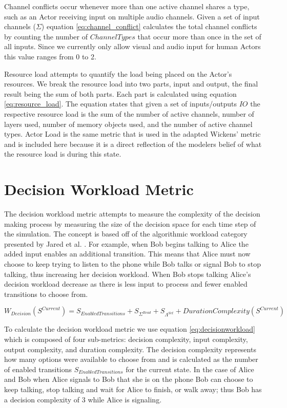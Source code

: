 Channel conflicts occur whenever more than one active channel shares a type, such as an Actor receiving input on multiple audio channels.  Given a set of input channels ($\Sigma$) equation \ref{eq:channel_conflict} calculates the total channel conflicts by counting the number of $ChannelTypes$ that occur more than once in the set of all inputs.  Since we currently only allow visual and audio input for human Actors this value ranges from 0 to 2.  

Resource load attempts to quantify the load being placed on the Actor's resources.  We break the resource load into two parts, input and output, the final result being the sum of both parts.  Each part is calculated using equation \ref{eq:resource_load}.  The equation states that given a set of inputs/outputs $IO$ the respective resource load is the sum of the number of active channels, number of layers used, number of memory objects used, and the number of active channel types.  Actor Load is the same metric that is used in the adapted Wickens' metric and is included here because it is a direct reflection of the modelers belief of what the resource load is during this state.


\section{Decision Workload Metric}

The decision workload metric attempts to measure the complexity of the decision making process by measuring the size of the decision space for each time step of the simulation.  The concept is based off of the algorithmic workload category presented by Jared et al. \cite{moore2014modeling}.  For example, when Bob begins talking to Alice the added input enables an additional transition.  This means that Alice must now choose to keep trying to listen to the phone while Bob talks or signal Bob to stop talking, thus increasing her decision workload.  When Bob stops talking Alice's decision workload decrease as there is less input to process and fewer enabled transitions to choose from.

\begin{equation}
  W_{Decision}(S^{Current}) = S_{EnabledTransitions} + S_{\Sigma^{Read}} + S_{\Lambda^{Set}} + DurationComplexity(S^{Current})
  \label{eq:decisionworkload}
\end{equation}

To calculate the decision workload metric we use equation \ref{eq:decisionworkload} which is composed of four sub-metrics: decision complexity, input complexity, output complexity, and duration complexity.  The decision complexity represents how many options were available to choose from and is calculated as the number of enabled transitions $S_{EnabledTransitions}$ for the current state.  In the case of Alice and Bob when Alice signals to Bob that she is on the phone Bob can choose to keep talking, stop talking and wait for Alice to finish, or walk away; thus Bob has a decision complexity of 3 while Alice is signaling.  

